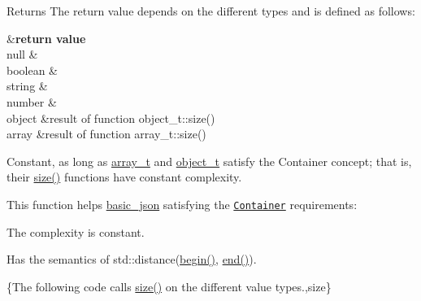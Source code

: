 \begin{DoxyReturn}{Returns}
The return value depends on the different types and is defined as follows\-: \begin{TabularC}{2}
\hline
{}&{\bf return value  }\\
null &{} \\
boolean &{} \\
string &{} \\
number &{} \\
object &result of function object\-\_\-t\-::size() \\
array &result of function array\-\_\-t\-::size() \\
\end{TabularC}
Constant, as long as \hyperlink{classnlohmann_1_1basic__json_ab00b882d39306d663c23dab110f5cae0}{array\-\_\-t} and \hyperlink{classnlohmann_1_1basic__json_a0ac9894c9de8dc551cf2e5f1c605537f}{object\-\_\-t} satisfy the Container concept; that is, their \hyperlink{classnlohmann_1_1basic__json_a0ea8a1ecca4b3cb0ba09ad7552c364b6}{size()} functions have constant complexity.
\end{DoxyReturn}
This function helps {\ttfamily \hyperlink{classnlohmann_1_1basic__json}{basic\-\_\-json}} satisfying the \href{http://en.cppreference.com/w/cpp/concept/Container}{\tt Container} requirements\-:
\begin{DoxyItemize}
\item The complexity is constant.
\item Has the semantics of {\ttfamily std\-::distance(\hyperlink{classnlohmann_1_1basic__json_ad4e381c54039607be08d7af41a1f6ad1}{begin()}, \hyperlink{classnlohmann_1_1basic__json_a12ccf14d39ddae52f6c7e126105a230b}{end()})}.
\end{DoxyItemize}

\{The following code calls {\ttfamily \hyperlink{classnlohmann_1_1basic__json_a0ea8a1ecca4b3cb0ba09ad7552c364b6}{size()}} on the different value types.,size\}

